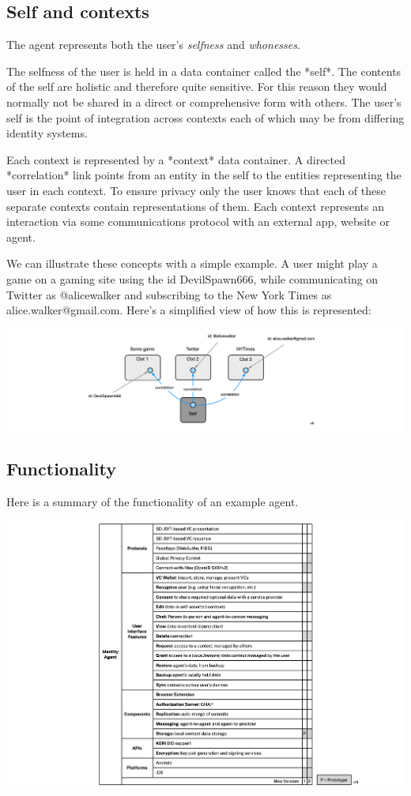 \documentclass[11pt, oneside]{article}   	%
\begin{document}
\subsection{Self and contexts}
The agent represents both the user's \emph{selfness} and \emph{whonesses}.

The selfness of the user is held in a data container called the *self*. The contents of the self are holistic and therefore quite sensitive. For this reason they would normally not be shared in a direct or comprehensive form with others. The user's self is the point of integration across contexts each of which may be from differing identity systems. 

Each context is represented by a *context* data container. A directed *correlation* link points from an entity in the self to the entities representing the user in each context. To ensure privacy only the user knows that each of these separate contexts contain representations of them. Each context represents an interaction via some communications protocol with an external app, website or agent. 

We can illustrate these concepts with a simple example. A user might play a game on a gaming site using the id DevilSpawn666, while communicating on Twitter as @alicewalker and subscribing to the New York Times as alice.walker@gmail.com. Here's a simplified view of how this is represented:

\includegraphics[width=\textwidth]{./images/example1.png}

\subsection{Functionality}

Here is a summary of the functionality of an example agent.

\includegraphics[width=\textwidth]{./images/agent-functionality.png}
\end{document}
